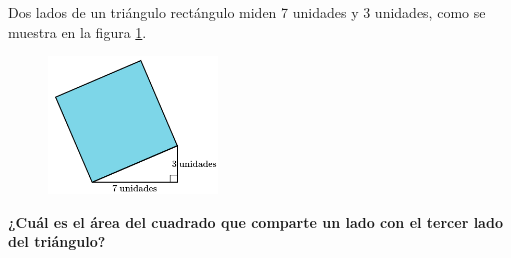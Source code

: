 \question[15]  Dos lados de un triángulo rectángulo miden 7 unidades y 3 unidades, como se muestra en la figura \ref{fig:area09}.
\begin{figure}[H]
    \begin{center}
        \includegraphics[width=0.4\textwidth]{../images/area09.png}
    \end{center}
    \caption{}
    \label{fig:area09}
\end{figure}
\textbf{¿Cuál es el área del cuadrado que comparte un lado con el tercer lado del triángulo?}